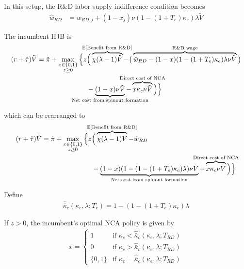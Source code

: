 \documentclass[11pt,english]{article}
\theoremstyle{remark}
\begin{document}
In this setup, the R\&D labor supply indifference condition becomes
\begin{align}
	\hat{w}_{RD} &= w_{RD,j} + (1-x_j) \nu (1-(1+T_e)\kappa_e) \lambda \tilde{V} \label{eq:RD_worker_indifference_entryTax}
\end{align}

The incumbent HJB is
\begin{align}
(r + \hat{\tau}) \tilde{V} = \tilde{\pi} + \max_{\substack{x \in \{0,1\} \\ z \ge 0}} \Big\{z &\Big( \overbrace{\chi (\lambda - 1) \tilde{V}}^{\mathclap{\mathbb{E}[\textrm{Benefit from R\&D}]}}-  \big( \overbrace{\hat{w}_{RD} - (1-x)(1-(1+T_e)\kappa_e)\lambda \nu \tilde{V}}^{\mathclap{\text{R\&D wage}}}\big) \label{eq:hjb_incumbent_entryTax} \nonumber \\ 
&-  \underbrace{(1-x) \nu \tilde{V}}_{\mathclap{\text{Net cost from spinout formation}}} - \overbrace{x \kappa_{c} \nu \tilde{V}}^{\mathclap{\text{Direct cost of NCA}}}\Big) \Big\} 
\end{align}

which can be rearranged to
\begin{align}
(r + \hat{\tau}) \tilde{V} = \tilde{\pi} + \max_{\substack{x \in \{0,1\} \\ z \ge 0}} \Big\{z &\Big( \overbrace{\chi (\lambda - 1) \tilde{V}}^{\mathclap{\mathbb{E}[\textrm{Benefit from R\&D}]}}- \hat{w}_{RD} \\
&-  \underbrace{(1-x)(1 - (1-(1+T_e)\kappa_{e})\lambda)\nu \tilde{V}}_{\mathclap{\text{Net cost from spinout formation}}} - \overbrace{x \kappa_{c} \nu \tilde{V}}^{\mathclap{\text{Direct cost of NCA}}}\Big) \Big\} \label{eq:hjb_incumbent_entryTax_2}
\end{align}

Define
\begin{align}
\hat{\bar{\kappa}}_c(\kappa_e,\lambda;T_e) = 1 - (1-(1+T_e)\kappa_e)\lambda  \label{eq:barkappa_entryTax}
\end{align} 

If $z > 0$, the incumbent's optimal NCA policy is given by 
\begin{align}
x = \begin{cases}
1 & \textrm{if } \kappa_{c} < \hat{\bar{\kappa}}_c (\kappa_e, \lambda;T_{RD}) \\
0 & \textrm{if } \kappa_{c} > \hat{\bar{\kappa}}_c (\kappa_e, \lambda;T_{RD})\\
\{0,1\} & \textrm{if } \kappa_c = \hat{\bar{\kappa}}_c (\kappa_e, \lambda;T_{RD})
\end{cases} \label{eq:nca_policy_entryTax}
\end{align}
\end{document}
